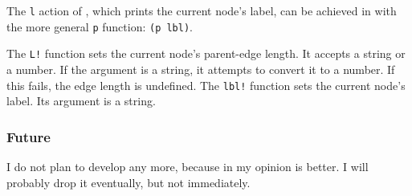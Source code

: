 \noindent{}The \texttt{l} action of \ed{}, which prints the current node's
label, can be achieved in \sched{} with the more general \texttt{p} function:
\texttt{(p lbl)}.

The \texttt{L!} function sets the current node's parent-edge length. It accepts
a string or a number. If the argument is a string, it attempts to convert it to
a number. If this fails, the edge length is undefined. The \texttt{lbl!}
function sets the current node's label. Its argument is a string.

\subsubsection{Future}

I do not plan to develop \sched{} any more, because in my opinion \luaed{} is
better. I will probably drop it eventually, but not immediately.
